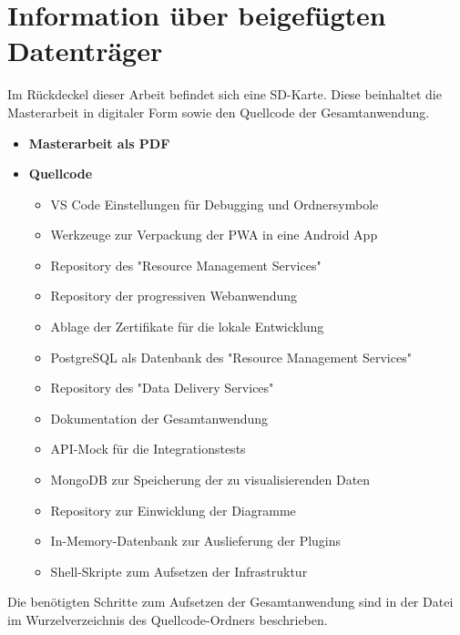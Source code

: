 \chapter{Information über beigefügten Datenträger}
\label{chap:informationueberbeigefuegtendatentraeger}
Im Rückdeckel dieser Arbeit befindet sich eine SD-Karte. Diese beinhaltet
die Masterarbeit in digitaler Form sowie den Quellcode der Gesamtanwendung.

\begin{small}
\begin{itemize}[noitemsep,nolistsep]
    \item \textbf{Masterarbeit als PDF}
    \item \textbf{Quellcode}
    \begin{itemize}[noitemsep,nolistsep]
        \item {} VS Code Einstellungen für Debugging und Ordnersymbole
        \item {} Werkzeuge zur Verpackung der PWA in eine Android App
        \item {} Repository des "Resource Management Services"
        \item {} Repository der progressiven Webanwendung
        \item {} Ablage der Zertifikate für die lokale Entwicklung
        \item {} PostgreSQL als Datenbank des "Resource Management Services"
        \item {} Repository des "Data Delivery Services"
        \item {} Dokumentation der Gesamtanwendung
        \item {} API-Mock für die Integrationstests
        \item {} MongoDB zur Speicherung der zu visualisierenden Daten
        \item {} Repository zur Einwicklung der Diagramme
        \item {} In-Memory-Datenbank zur Auslieferung der Plugins
        \item {} Shell-Skripte zum Aufsetzen der Infrastruktur
    \end{itemize}
\end{itemize}
\end{small}

\bigskip

\begin{small}
\begin{myboxi}[Hinweis]
Die benötigten Schritte zum Aufsetzen der Gesamtanwendung sind in der 
 Datei im Wurzelverzeichnis des Quellcode-Ordners beschrieben.
\end{myboxi}
\end{small}

